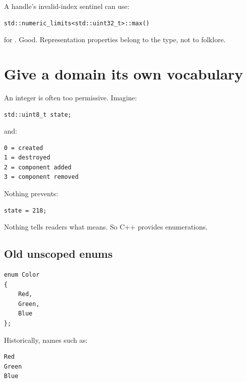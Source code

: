 A handle's invalid-index sentinel can use:

\begin{verbatim}
std::numeric_limits<std::uint32_t>::max()
\end{verbatim}

for . Good. Representation properties belong to the type, not to folklore.

\section{Give a domain its own vocabulary}\label{01-foundations-i-ch002-give-a-domain-its-own-vocabulary}

\hypertarget{01-foundations-i-ch002-give-a-domain-its-own-vocabulary}{}

An integer is often too permissive. Imagine:

\begin{verbatim}
std::uint8_t state;
\end{verbatim}

and:

\begin{verbatim}
0 = created
1 = destroyed
2 = component added
3 = component removed
\end{verbatim}

Nothing prevents:

\begin{verbatim}
state = 218;
\end{verbatim}

Nothing tells readers what  means. So C++ provides enumerations.

\subsection{Old unscoped enums}\label{01-foundations-i-ch002-old-unscoped-enums}

\hypertarget{01-foundations-i-ch002-old-unscoped-enums}{}

\begin{verbatim}
enum Color
{
    Red,
    Green,
    Blue
};
\end{verbatim}

Historically, names such as:

\begin{verbatim}
Red
Green
Blue
\end{verbatim}

